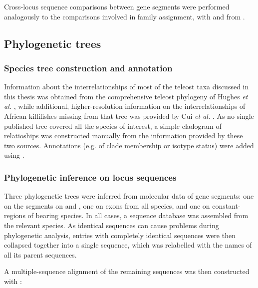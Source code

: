 \noindent Cross-locus sequence comparisons between gene segments were performed analogously to the comparisons involved in \vh family assignment, with  and  from .


\subsection{Phylogenetic trees}
\label{sec:methods_comp_trees}


\subsubsection{Species tree construction and annotation}
\label{sec:methods_comp_trees_species}

Information about the interrelationships of most of the teleost taxa discussed in this thesis was obtained from the comprehensive teleost phylogeny of Hughes \textit{et al.} \parencite{hughes2018teleostphylo}, while additional, higher-resolution information on the interrelationships of African killifishes missing from that tree was provided by Cui \textit{et al.} \parencite{cui2019annual}. As no single published tree covered all the species of interest, a simple cladogram of relatioships was constructed manually from the information provided by these two sources. Annotations (e.g. of clade membership or isotype status) were added using  \parencite{guangchuang2018tidytree}.

\subsubsection{Phylogenetic inference on \igh{} locus sequences}
\label{sec:methods_comp_trees_phylo}

Three phylogenetic trees were inferred from molecular data of  gene segments: one on the \vh segments on \nfu and \xma, one on \ch exons from all species, and one on  constant-regions of  bearing species. In all cases, a sequence  database was assembled from the relevant species. As identical sequences can cause problems during phylogenetic analysis, entries with completely identical sequences  were then collapsed together into a single  sequence, which was relabelled with the names of all its parent sequences. 

A multiple-sequence alignment of the remaining sequences was then constructed with :

